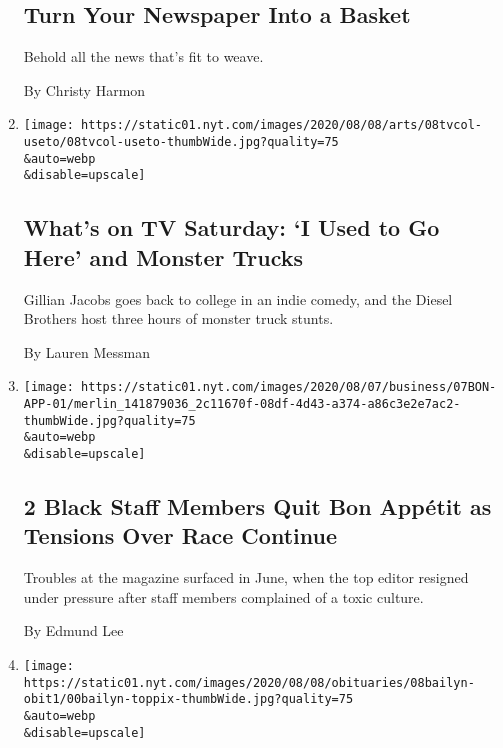 \begin{enumerate}
{  \subsection{Turn Your Newspaper Into a
  Basket}\label{turn-your-newspaper-into-a-basket}}

  Behold all the news that's fit to weave.

  By Christy Harmon
\item
  \href{/2020/08/08/arts/television/whats-on-tv-saturday-i-used-to-go-here-and-monster-trucks.html}{}

  \texttt{[image: https://static01.nyt.com/images/2020/08/08/arts/08tvcol-useto/08tvcol-useto-thumbWide.jpg?quality=75\\\&auto=webp\\\&disable=upscale]}

  \hypertarget{whats-on-tv-saturday-i-used-to-go-here-and-monster-trucks}{%
  \subsection{What's on TV Saturday: `I Used to Go Here' and Monster
  Trucks}\label{whats-on-tv-saturday-i-used-to-go-here-and-monster-trucks}}

  Gillian Jacobs goes back to college in an indie comedy, and the Diesel
  Brothers host three hours of monster truck stunts.

  By Lauren Messman
\item
  \href{/2020/08/07/business/media/bon-appetit-race-black-staff-quits.html}{}

  \texttt{[image: https://static01.nyt.com/images/2020/08/07/business/07BON-APP-01/merlin\_141879036\_2c11670f-08df-4d43-a374-a86c3e2e7ac2-thumbWide.jpg?quality=75\\\&auto=webp\\\&disable=upscale]}

  \hypertarget{2-black-staff-members-quit-bon-appuxe9tit-as-tensions-over-race-continue}{%
  \subsection{2 Black Staff Members Quit Bon Appétit as Tensions Over
  Race
  Continue}\label{2-black-staff-members-quit-bon-appuxe9tit-as-tensions-over-race-continue}}

  Troubles at the magazine surfaced in June, when the top editor
  resigned under pressure after staff members complained of a toxic
  culture.

  By Edmund Lee
\item
  \href{/2020/08/07/books/bernard-bailyn-dead.html}{}

  \texttt{[image: https://static01.nyt.com/images/2020/08/08/obituaries/08bailyn-obit1/00bailyn-toppix-thumbWide.jpg?quality=75\\\&auto=webp\\\&disable=upscale]}


\end{enumerate}
